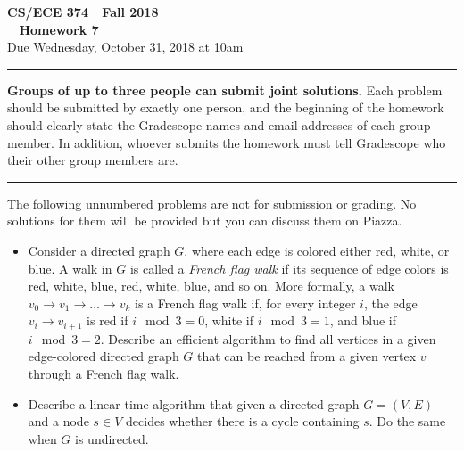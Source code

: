 \documentclass[11pt]{article}
\begin{document}

\thispagestyle{empty}

\begin{center}
\Large\textbf{CS/ECE 374 \,\decosix\,  Fall 2018}%
\\
\LARGE\textbf{\decothreeleft~ Homework 7 ~\decothreeright}%
\\[0.5ex]
\large Due Wednesday, October 31, 2018 at 10am
\end{center}

\bigskip
\hrule
\bigskip

\noindent
\textbf{Groups of up to three people can submit joint solutions.}
Each problem should be submitted by exactly one person, and the
beginning of the homework should clearly state the Gradescope names
and email addresses of each group member.  In addition, whoever
submits the homework must tell Gradescope who their other group
members are.
\bigskip \hrule \bigskip


\noindent
The following unnumbered problems are not for submission or grading.
No solutions for them will be provided but you can discuss them on Piazza.
\begin{itemize}
\item Consider a directed graph $G$, where each edge is colored either
  red, white, or blue. A walk in $G$ is called a {\em French flag
    walk} if its sequence of edge colors is red, white, blue, red,
  white, blue, and so on. More formally, a walk $v_0\rightarrow v_1
  \rightarrow \ldots \rightarrow v_k$ is a French flag walk if, for
  every integer $i$, the edge $v_i \rightarrow v_{i+1}$ is red if $i
  \mod 3 = 0$, white if $i \mod 3 = 1$, and blue if $i \mod 3 = 2$.
  Describe an efficient algorithm to find all vertices in a given
  edge-colored directed graph $G$ that can be reached from a given
  vertex $v$ through a French flag walk.
\item Describe a linear time algorithm that given a directed graph
  $G=(V,E)$ and a node $s \in V$ decides whether there is a cycle
  containing $s$. Do the same when $G$ is undirected.
\end{itemize}

\vspace{1cm}
\end{document}
